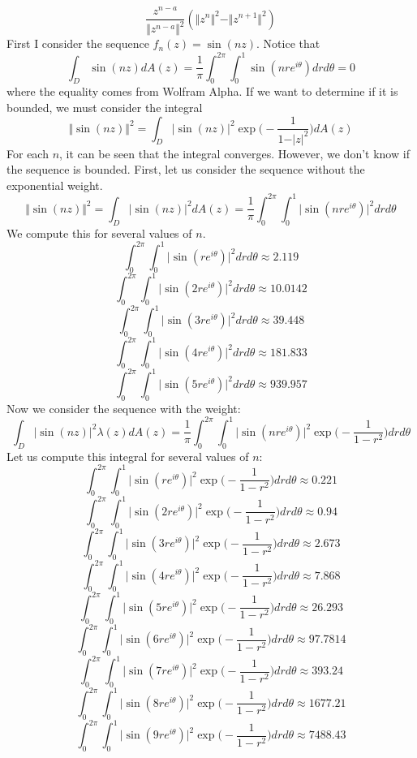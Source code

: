\documentclass[12pt]{article}
\begin{document}
\[
\frac{z^{n-a}}{\Vert z^{n-a}\Vert^2} (\Vert z^n \Vert^2 - \Vert z^{n+1} \Vert^2)
\]
First I consider the sequence $f_n(z) = \sin(nz)$. Notice that
\[
\int_D \sin(nz) dA(z) = \frac{1}{\pi} \int_0^{2\pi} \int_0^1 \sin(nre^{i\theta}) dr d\theta = 0
\] where the equality comes from Wolfram Alpha. If we want to determine if it is bounded, we must consider the integral
\[
\Vert \sin(nz) \Vert^2 = \int_D \vert \sin(nz) \vert^2 \exp\bigg(-\frac{1}{1-\vert z \vert^2}\bigg) dA(z)
\] For each $n$, it can be seen that the integral converges. However, we don't know if the sequence is bounded. First, let us consider the sequence without the exponential weight.
\[
\Vert \sin(nz) \Vert^2 = \int_D \vert \sin(nz) \vert^2 dA(z) = \frac{1}{\pi} \int_0^{2\pi} \int_0^1 \vert \sin(nre^{i\theta})\vert^2 dr d\theta
\] We compute this for several values of $n$.
\[
\int_0^{2\pi} \int_0^1 \vert \sin(re^{i\theta})\vert^2 dr d\theta \approx  2.119
\]
\[
\int_0^{2\pi} \int_0^1 \vert \sin(2re^{i\theta})\vert^2 dr d\theta \approx  10.0142
\]
\[
\int_0^{2\pi} \int_0^1 \vert \sin(3re^{i\theta})\vert^2 dr d\theta \approx  39.448
\]
\[
\int_0^{2\pi} \int_0^1 \vert \sin(4re^{i\theta})\vert^2 dr d\theta \approx  181.833
\]
\[
\int_0^{2\pi} \int_0^1 \vert \sin(5re^{i\theta})\vert^2 dr d\theta \approx  939.957
\] Now we consider the sequence with the weight:
\[
\int_D \vert \sin(nz) \vert^2 \lambda(z) dA(z) = \frac{1}{\pi} \int_0^{2\pi} \int_0^1 \vert \sin(nre^{i\theta}) \vert^2 \exp\bigg(-\frac{1}{1-r^2}\bigg) dr d\theta
\] Let us compute this integral for several values of $n$:
\[
\int_0^{2\pi} \int_0^1 \vert \sin(re^{i\theta}) \vert^2 \exp\bigg(-\frac{1}{1-r^2}\bigg) dr d\theta \approx 0.221
\]
\[
\int_0^{2\pi} \int_0^1 \vert \sin(2re^{i\theta}) \vert^2 \exp\bigg(-\frac{1}{1-r^2}\bigg) dr d\theta \approx 0.94
\]
\[
\int_0^{2\pi} \int_0^1 \vert \sin(3re^{i\theta}) \vert^2 \exp\bigg(-\frac{1}{1-r^2}\bigg) dr d\theta \approx 2.673
\] 
\[
\int_0^{2\pi} \int_0^1 \vert \sin(4re^{i\theta}) \vert^2 \exp\bigg(-\frac{1}{1-r^2}\bigg) dr d\theta \approx 7.868
\]
\[
\int_0^{2\pi} \int_0^1 \vert \sin(5re^{i\theta}) \vert^2 \exp\bigg(-\frac{1}{1-r^2}\bigg) dr d\theta \approx 26.293
\]
\[
\int_0^{2\pi} \int_0^1 \vert \sin(6re^{i\theta}) \vert^2 \exp\bigg(-\frac{1}{1-r^2}\bigg) dr d\theta \approx 97.7814
\]
\[
\int_0^{2\pi} \int_0^1 \vert \sin(7re^{i\theta}) \vert^2 \exp\bigg(-\frac{1}{1-r^2}\bigg) dr d\theta \approx 393.24
\]
\[
\int_0^{2\pi} \int_0^1 \vert \sin(8re^{i\theta}) \vert^2 \exp\bigg(-\frac{1}{1-r^2}\bigg) dr d\theta \approx 1677.21
\]
\[
\int_0^{2\pi} \int_0^1 \vert \sin(9re^{i\theta}) \vert^2 \exp\bigg(-\frac{1}{1-r^2}\bigg) dr d\theta \approx 7488.43
\]
\end{document}

